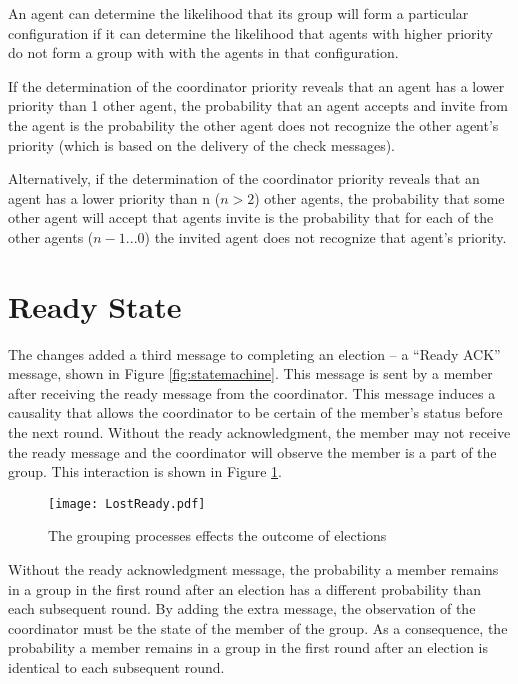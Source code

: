 An agent can determine the likelihood that its group will form a particular configuration if it can determine the likelihood that agents with higher priority do not form a group with with the agents in that configuration.

If the determination of the coordinator priority reveals that an agent has a lower priority than 1 other agent, the probability that an agent accepts and invite from the agent is the probability the other agent does not recognize the other agent's priority (which is based on the delivery of the check messages).

Alternatively, if the determination of the coordinator priority reveals that an agent has a lower priority than n ($n > 2$) other agents, the probability that some other agent will accept that agents invite is the probability that for each of the other agents ($n-1 ... 0$) the invited agent does not recognize that agent's priority.

\section{Ready State}

The changes added a third message to completing an election -- a ``Ready ACK'' message, shown in Figure \ref{fig:statemachine}.
This message is sent by a member after receiving the ready message from the coordinator.
This message induces a causality that allows the coordinator to be certain of the member's status before the next round.
Without the ready acknowledgment, the member may not receive the ready message and the coordinator will observe the member is a part of the group.
This interaction is shown in Figure \ref{fig:lostready}.

\begin{figure}
\begin{centering}
\texttt{[image: LostReady.pdf]}
\caption{The grouping processes effects the outcome of elections} \label{fig:lostready}
\end{centering}
\end{figure}

Without the ready acknowledgment message, the probability a member remains in a group in the first round after an election has a different probability than each subsequent round.
By adding the extra message, the observation of the coordinator must be the state of the member of the group.
As a consequence, the probability a member remains in a group in the first round after an election is identical to each subsequent round.

